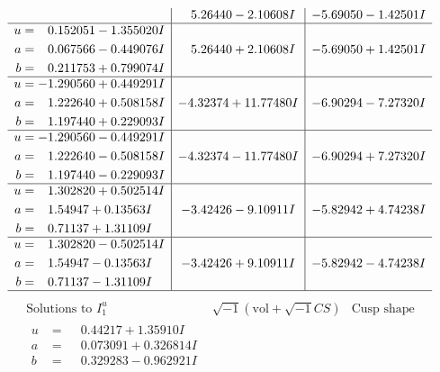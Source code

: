 \documentclass[1p]{elsarticle_modified}
\theoremstyle{definition}
\newcommand{\I}{\sqrt{-1}}
\begin{document}
$$\begin{array}{c|c|c}
 & \phantom{-}5.26440 - 2.10608 I & -5.69050 - 1.42501 I \\ \hline\begin{aligned}
u &= \phantom{-}0.152051 - 1.355020 I \\
a &= \phantom{-}0.067566 - 0.449076 I \\
b &= \phantom{-}0.211753 + 0.799074 I\end{aligned}
 & \phantom{-}5.26440 + 2.10608 I & -5.69050 + 1.42501 I \\ \hline\begin{aligned}
u &= -1.290560 + 0.449291 I \\
a &= \phantom{-}1.222640 + 0.508158 I \\
b &= \phantom{-}1.197440 + 0.229093 I\end{aligned}
 & -4.32374 + 11.77480 I & -6.90294 - 7.27320 I \\ \hline\begin{aligned}
u &= -1.290560 - 0.449291 I \\
a &= \phantom{-}1.222640 - 0.508158 I \\
b &= \phantom{-}1.197440 - 0.229093 I\end{aligned}
 & -4.32374 - 11.77480 I & -6.90294 + 7.27320 I \\ \hline\begin{aligned}
u &= \phantom{-}1.302820 + 0.502514 I \\
a &= \phantom{-}1.54947 + 0.13563 I \\
b &= \phantom{-}0.71137 + 1.31109 I\end{aligned}
 & -3.42426 - 9.10911 I & -5.82942 + 4.74238 I \\ \hline\begin{aligned}
u &= \phantom{-}1.302820 - 0.502514 I \\
a &= \phantom{-}1.54947 - 0.13563 I \\
b &= \phantom{-}0.71137 - 1.31109 I\end{aligned}
 & -3.42426 + 9.10911 I & -5.82942 - 4.74238 I\\
 \hline 
 \end{array}$$\newpage$$\begin{array}{c|c|c}  
\text{Solutions to }I^u_{1}& \I (\text{vol} + \sqrt{-1}CS) & \text{Cusp shape}\\
 \hline 
\begin{aligned}
u &= \phantom{-}0.44217 + 1.35910 I \\
a &= \phantom{-}0.073091 + 0.326814 I \\
b &= \phantom{-}0.329283 - 0.962921 I\end{aligned}

\end{array}$$
\end{document}
